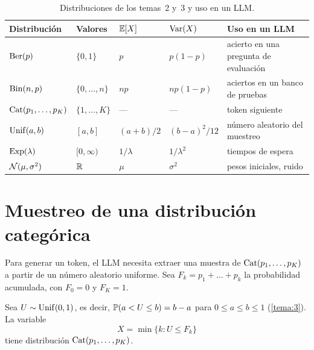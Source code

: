 \begin{table}[h]
\centering\small
\caption{Distribuciones de los temas~2 y~3 y uso en un LLM.}\label{tab:distribuciones}
\begin{tabular}{@{}lllll@{}}
\toprule
Distribución & Valores & $\mathbb{E}[X]$ & $\operatorname{Var}(X)$ & Uso en un LLM \\
\midrule
$\operatorname{Ber}(p)$ & $\{0,1\}$ & $p$ & $p(1-p)$ & acierto en una pregunta de evaluación \\
$\operatorname{Bin}(n,p)$ & $\{0,\dots,n\}$ & $np$ & $np(1-p)$ & aciertos en un banco de pruebas \\
$\operatorname{Cat}(p_1,\dots,p_K)$ & $\{1,\dots,K\}$ & --- & --- & token siguiente \\
$\operatorname{Unif}(a,b)$ & $[a,b]$ & $(a+b)/2$ & $(b-a)^{2}/12$ & número aleatorio del muestreo \\
$\operatorname{Exp}(\lambda)$ & $[0,\infty)$ & $1/\lambda$ & $1/\lambda^{2}$ & tiempos de espera \\
$\mathcal{N}(\mu,\sigma^{2})$ & $\mathbb{R}$ & $\mu$ & $\sigma^{2}$ & pesos iniciales, ruido \\
\bottomrule
\end{tabular}
\end{table}

\section{Muestreo de una distribución categórica}

Para generar un token, el LLM necesita extraer una muestra de $\operatorname{Cat}(p_1,\dots,p_K)$ a partir de un número aleatorio uniforme. Sea $F_k=p_1+\dots+p_k$ la probabilidad acumulada, con $F_0=0$ y $F_K=1$.

\begin{proposicion}\label{prop:inversa-discreta}
Sea $U\sim\operatorname{Unif}(0,1)$, es decir, $\mathbb{P}(a<U\le b)=b-a$ para $0\le a\le b\le 1$ (\cref{tema:3}). La variable
\[
X=\min\{k: U\le F_k\}
\]
tiene distribución $\operatorname{Cat}(p_1,\dots,p_K)$.
\end{proposicion}

\addtocounter{figure}{1}%

\addtocounter{definicion}{1}%

\addtocounter{definicion}{1}%

